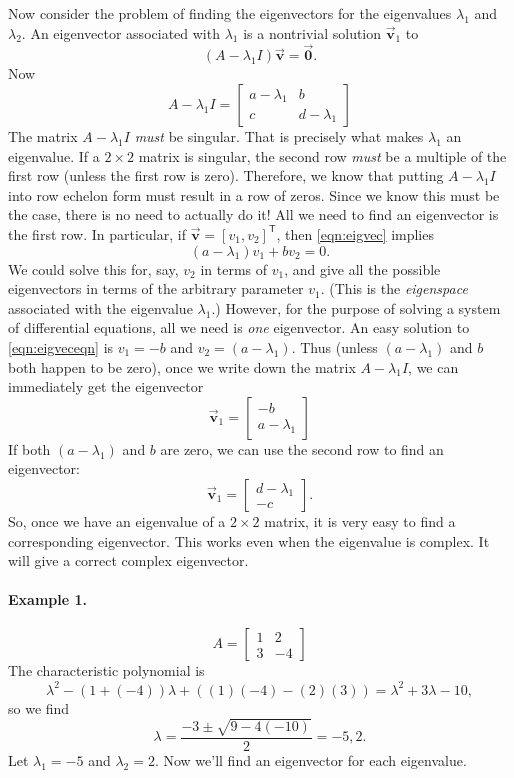 \documentclass{book}
\newcommand{\BV}{\vec{\textbf{v}}}
\newcommand{\BZ}{\vec{\textbf{0}}}  %
\begin{document}
Now consider the problem of finding the eigenvectors
for the eigenvalues $\lambda_1$ and $\lambda_2$.
An eigenvector associated with $\lambda_1$ is a nontrivial
solution $\BV_1$ to
\begin{equation}
    (A-\lambda_1 I)\BV = \BZ.
\label{eqn:eigvec}
\end{equation}
Now
\[
   A - \lambda_1 I = \begin{bmatrix}
                           a-\lambda_1 & b \\
			   c & d-\lambda_1
                     \end{bmatrix}
\]
The matrix $A-\lambda_1 I$ \emph{must} be singular.
That is precisely what makes $\lambda_1$ an eigenvalue.
If a $2\times 2$ matrix is singular, the second
row \emph{must} be a multiple of the first row (unless
the first row is zero).  Therefore, we know that putting
$A-\lambda_1 I$ into row echelon form must result in
a row of zeros.  Since we know this must be the case,
there is no need to actually do it!  All we need to
find an eigenvector is the first row.
In particular, if $\BV = [v_1,v_2]^{\textsf{T}}$,
then \eqref{eqn:eigvec} implies
\begin{equation}
  (a-\lambda_1)v_1 + b v_2 = 0.
\label{eqn:eigveceqn}
\end{equation}
We could solve this for, say, $v_2$ in terms of $v_1$,
and give all the possible eigenvectors in terms of
the arbitrary parameter $v_1$. (This is the
\emph{eigenspace} associated with the eigenvalue $\lambda_1$.)
However, for the
purpose of solving a system of differential equations,
all we need is \emph{one} eigenvector.
An easy solution to \eqref{eqn:eigveceqn}
is $v_1=-b$ and $v_2 = (a-\lambda_1)$.
Thus (unless $(a-\lambda_1)$ and $b$ both happen to be
zero), once we write down the matrix $A-\lambda_1 I$,
we can immediately get the eigenvector
\[
   \BV_1 = \begin{bmatrix} -b \\ a-\lambda_1 \end{bmatrix}
\]
If both $(a-\lambda_1)$ and $b$ are zero, we can use the
second row to find an eigenvector:
\[
   \BV_1 = \begin{bmatrix} d-\lambda_1 \\ -c \end{bmatrix}.
\]
So, once we have an eigenvalue
of a $2\times 2$ matrix, it is very easy to find
a corresponding eigenvector.
This works even when the eigenvalue is complex.
It will give a correct complex eigenvector.

\paragraph{Example 1.}
\[
   A = \begin{bmatrix} 1 & 2 \\ 3 & -4 \end{bmatrix}
\]
The characteristic polynomial is
\[
   \lambda^2 - (1+(-4))\lambda + ((1)(-4)-(2)(3)) = \lambda^2 + 3\lambda - 10,
\]
so we find
\[
  \lambda = \frac{-3\pm\sqrt{9-4(-10)}}{2} = -5, 2.
\]
Let $\lambda_1 = -5$ and $\lambda_2 = 2$.
Now we'll find an eigenvector for each eigenvalue.
\end{document}
